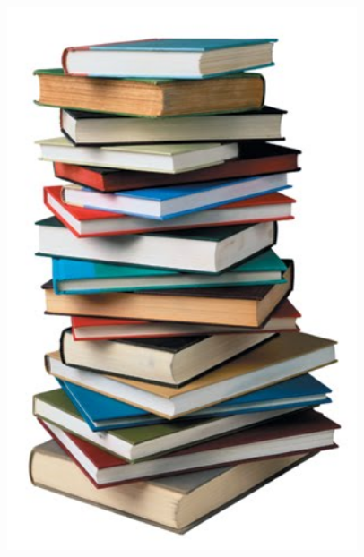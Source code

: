 \begin{frame}
\begin{columns}[c]
\begin{column}{0.33\textwidth}
\begin{center}
                \includegraphics[width=0.99\textwidth]{jpg/documentation.jpg}\\
            \end{center}
        \end{column}
        \begin{column}{0.33\textwidth}
            \begin{center}

\end{center}
\end{column}
\end{columns}
\end{frame}

